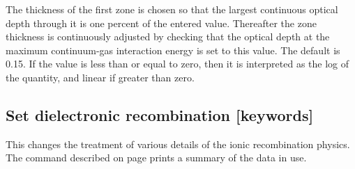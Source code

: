 The thickness of the first zone is chosen so that the largest continuous
optical depth through it is one percent of the entered value.
Thereafter
the zone thickness is continuously adjusted by checking that the optical
depth at the maximum continuum-gas interaction energy is set to this value.
The default is 0.15.
If the value is less than or equal to zero, then it
is interpreted as the log of the quantity, and linear if greater than zero.

\subsection{Set dielectronic recombination [keywords]}
\label{sec:SetRecombination}

This changes
the treatment of various details of the ionic recombination physics.
The  command described on page
\pageref{sec:PrintRecombination} prints a summary of the data in use.

